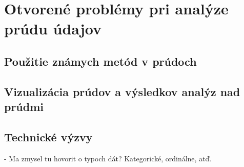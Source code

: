 \chapter{Otvorené problémy pri analýze prúdu údajov}
\label{Otvorené problémy pri analýze prúdu údajov}

\section{Použitie známych metód v prúdoch}

\section{Vizualizácia prúdov a výsledkov analýz nad prúdmi}

\section{Technické výzvy}
 - Ma zmysel tu hovorit o typoch dát? Kategorické, ordinálne, atď.